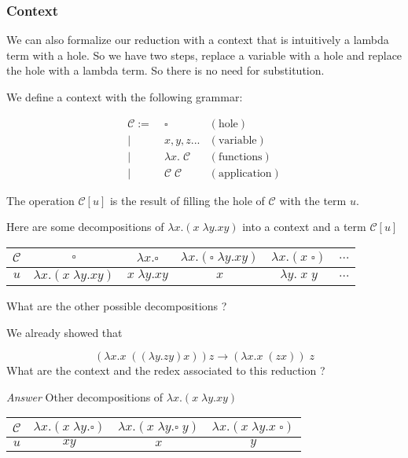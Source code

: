 \documentclass{article}
\theoremstyle{plain}
\theoremstyle{plain}
\begin{document}
  \subsubsection{Context}

  We can also formalize our reduction with a context that is intuitively a
  lambda term with a hole. So we have two steps, replace a variable with a hole
  and replace the hole with a lambda term. So there is no need for substitution.

  We define a context with the following grammar:

  \begin{align*}
    \mathcal C :=&\; \square              & (\text{hole})\\
             |&\; x, y, z ...             & (\text{variable}) \\
             |&\; \lambda x.\; \mathcal C & (\text{functions}) \\
             |&\; \mathcal C\; \mathcal C & (\text{application})
  \end{align*}

  The operation $\mathcal C[u]$ is the result of filling the hole of $\mathcal
  C$ with the term $u$.

  \exo Here are some decompositions of $\lambda x.(x\; \lambda y.xy)$ into a
  context and a term $\mathcal C[u]$

  \begin{center}
  \begin{tabular}{c|c|c|c|c|c}
    $\mathcal C$ & $\square$ & $\lambda x.\square$ & $\lambda x.(\square\;
    \lambda y.xy)$ & $\lambda x.(x\; \square)$ & $\ldots$ \\
    \hline
    $u$ & $\lambda x.(x\; \lambda y.xy)$ & $x\; \lambda y.xy$ & $x$ & $\lambda
    y.\; x\;y$ & $\ldots$
  \end{tabular}
  \end{center}

  What are the other possible decompositions ?

  We already showed that

  \[
    (\lambda x.x\; ((\lambda y.zy)x))z \to (\lambda x.x\; (zx))\; z
  \]
  What are the context and the redex associated to this reduction ?

  \textit{Answer} Other decompositions of $\lambda x.(x\; \lambda y.xy)$

  \begin{center}
  \begin{tabular}{c|c|c|c|}
    $\mathcal C$ & $\lambda x.(x\; \lambda y.\square)$ & $\lambda x.(x\; \lambda
    y.\square\; y)$ & $\lambda x.(x\; \lambda y. x\; \square)$ \\
    \hline
    $u$ & $xy$ & $x$ & $y$
  \end{tabular}
  \end{center}
\end{document}
